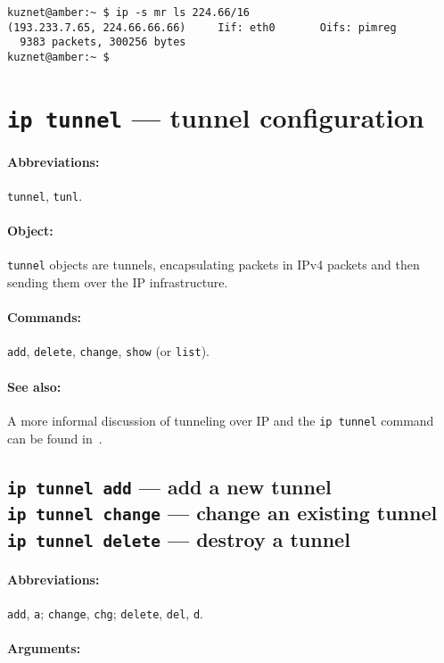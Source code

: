 \begin{verbatim}
kuznet@amber:~ $ ip -s mr ls 224.66/16
(193.233.7.65, 224.66.66.66)     Iif: eth0       Oifs: pimreg 
  9383 packets, 300256 bytes
kuznet@amber:~ $
\end{verbatim}


\section{{\tt ip tunnel} --- tunnel configuration}
\label{IP-TUNNEL}

\paragraph{Abbreviations:} \verb|tunnel|, \verb|tunl|.

\paragraph{Object:} \verb|tunnel| objects are tunnels, encapsulating
packets in IPv4 packets and then sending them over the IP infrastructure.

\paragraph{Commands:} \verb|add|, \verb|delete|, \verb|change|, \verb|show|
(or \verb|list|).

\paragraph{See also:} A more informal discussion of tunneling
over IP and the \verb|ip tunnel| command can be found in~\cite{IP-TUNNELS}.

\subsection{{\tt ip tunnel add} --- add a new tunnel\\
	{\tt ip tunnel change} --- change an existing tunnel\\
	{\tt ip tunnel delete} --- destroy a tunnel}

\paragraph{Abbreviations:} \verb|add|, \verb|a|; \verb|change|, \verb|chg|;
\verb|delete|, \verb|del|, \verb|d|.


\paragraph{Arguments:}

